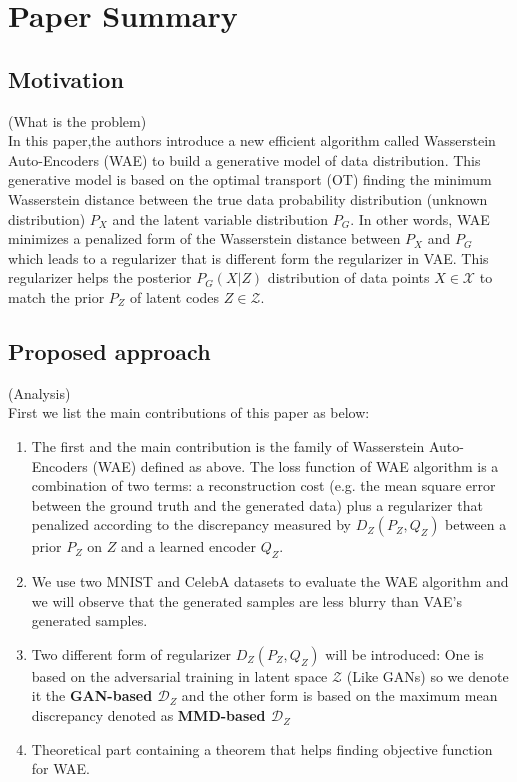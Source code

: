 \documentclass[12pt,english]{amsart}
\begin{document}
\section{Paper Summary}
\subsection{Motivation}
(What is the problem)\\
In this paper,the authors introduce a new efficient algorithm called Wasserstein
Auto-Encoders (WAE) to build a generative model of data distribution. This
generative model is based on the optimal transport (OT) finding the minimum
Wasserstein distance between the true data probability distribution (unknown
distribution) $P_X$ and the latent variable distribution $P_G$. In other words,
WAE minimizes a penalized form of the Wasserstein distance between $P_X$ and
$P_G$ which leads to a regularizer that is different form the regularizer in
VAE. This regularizer helps the posterior $P_G(X|Z)$ distribution of data points
$X\in \mathcal{X}$ to match the prior $P_Z$ of latent codes $Z \in \mathcal{Z}$.

\subsection{Proposed approach}

(Analysis)\\

First we list the main contributions of this paper as below:

\begin{enumerate}
  \item The first and the main contribution is the family of Wasserstein
        Auto-Encoders (WAE) defined as above. The loss function of WAE algorithm
        is a combination of two terms: a reconstruction cost (e.g. the mean square error between the ground truth and the generated data) plus a regularizer that penalized according to the discrepancy measured by $D_{Z}(P_Z, Q_Z)$ between a prior $P_Z$ on $Z$ and a learned encoder $Q_Z$.

  \item We use two MNIST and CelebA datasets to evaluate the WAE algorithm and we
        will observe that the generated samples are less blurry than VAE's generated
        samples.

  \item Two different form of regularizer $D_Z(P_Z, Q_Z)$ will be introduced: One
        is based on the adversarial training in latent space $\mathcal{Z}$ (Like
        GANs) so we denote it the \textbf{ GAN-based $\mathcal{D}_Z$} and the
        other form is based on the maximum mean discrepancy denoted as
        \textbf{MMD-based $\mathcal{D}_Z $}

  \item Theoretical part containing a theorem that helps finding objective
        function for WAE.

\end{enumerate}
\end{document}
